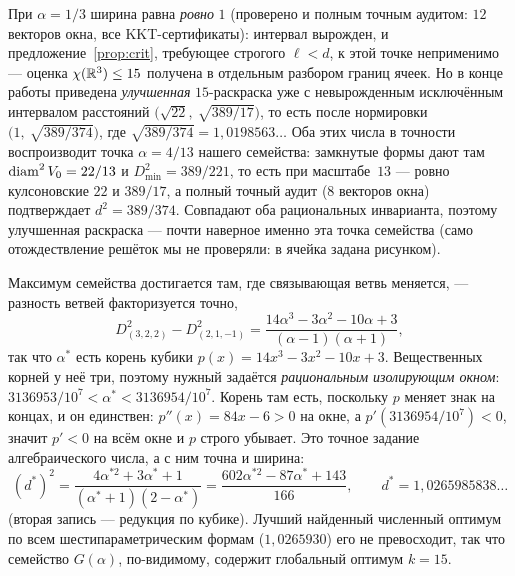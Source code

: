 При $\alpha=1/3$ ширина равна \emph{ровно} $1$ (проверено и полным точным
аудитом: $12$ векторов окна, все KKT-сертификаты): интервал вырожден, и
предложение~\ref{prop:crit}, требующее строгого $\ell<d$, к этой точке
неприменимо --- оценка $\chi(\mathbb{R}^3)\le15$ получена в \cite{Coulson} отдельным
разбором границ ячеек. Но в конце работы \cite{Coulson} приведена
\emph{улучшенная} $15$-раскраска уже с невырожденным исключённым интервалом
расстояний $\bigl(\sqrt{22},\ \sqrt{389/17}\bigr)$, то есть после нормировки
$\bigl(1,\ \sqrt{389/374}\bigr)$, где
$\sqrt{389/374}=1{,}0198563\ldots$ Оба этих числа в точности воспроизводит
точка $\alpha=4/13$ нашего семейства: замкнутые формы дают там
$\operatorname{diam}^2 V_0=22/13$ и $D^2_{\min}=389/221$, то есть при масштабе~$13$ ---
ровно кулсоновские $22$ и $389/17$, а полный точный аудит ($8$ векторов окна)
подтверждает $d^2=389/374$. Совпадают оба рациональных инварианта, поэтому
улучшенная раскраска \cite{Coulson} --- почти наверное именно эта точка
семейства (само отождествление решёток мы не проверяли: в \cite{Coulson}
ячейка задана рисунком).

Максимум семейства достигается там, где связывающая ветвь меняется, ---
разность ветвей факторизуется точно,
\[
D^2_{(3,2,2)}-D^2_{(2,1,-1)}
=\frac{14\alpha^3-3\alpha^2-10\alpha+3}{(\alpha-1)(\alpha+1)},
\]
так что $\alpha^*$ есть корень кубики $p(x)=14x^3-3x^2-10x+3$. Вещественных
корней у неё три, поэтому нужный задаётся \emph{рациональным изолирующим
окном}: $3136953/10^7<\alpha^*<3136954/10^7$. Корень там есть, поскольку
$p$ меняет знак на концах, и он единствен: $p''(x)=84x-6>0$ на окне, а
$p'(3136954/10^7)<0$, значит $p'<0$ на всём окне и $p$ строго убывает. Это
точное задание алгебраического числа, а с ним точна и ширина:
\[
(d^*)^2=\frac{4\alpha^{*2}+3\alpha^*+1}{(\alpha^*+1)(2-\alpha^*)}
=\frac{602\alpha^{*2}-87\alpha^*+143}{166},
\qquad d^*=1{,}0265985838\ldots
\]
(вторая запись --- редукция по кубике). Лучший найденный численный оптимум по
всем шестипараметрическим формам ($1{,}0265930$) его не превосходит, так что
семейство $G(\alpha)$, по-видимому, содержит глобальный оптимум $k=15$.

